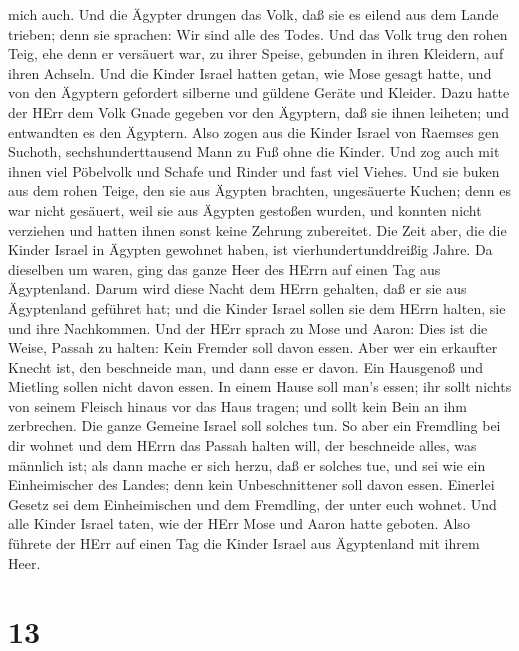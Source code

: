mich auch.  Und die Ägypter drungen das Volk, daß sie es
eilend aus dem Lande trieben; denn sie sprachen: Wir sind alle des
Todes.  Und das Volk trug den rohen Teig, ehe denn er
versäuert war, zu ihrer Speise, gebunden in ihren Kleidern, auf ihren
Achseln.  Und die Kinder Israel hatten getan, wie Mose
gesagt hatte, und von den Ägyptern gefordert silberne und güldene Geräte
und Kleider.  Dazu hatte der HErr dem Volk Gnade gegeben
vor den Ägyptern, daß sie ihnen leiheten; und entwandten es den
Ägyptern.  Also zogen aus die Kinder Israel von Raemses gen
Suchoth, sechshunderttausend Mann zu Fuß ohne die Kinder. 
Und zog auch mit ihnen viel Pöbelvolk und Schafe und Rinder und fast
viel Viehes.  Und sie buken aus dem rohen Teige, den sie
aus Ägypten brachten, ungesäuerte Kuchen; denn es war nicht gesäuert,
weil sie aus Ägypten gestoßen wurden, und konnten nicht verziehen und
hatten ihnen sonst keine Zehrung zubereitet.  Die Zeit
aber, die die Kinder Israel in Ägypten gewohnet haben, ist
vierhundertunddreißig Jahre.  Da dieselben um waren, ging
das ganze Heer des HErrn auf einen Tag aus Ägyptenland. 
Darum wird diese Nacht dem HErrn gehalten, daß er sie aus Ägyptenland
geführet hat; und die Kinder Israel sollen sie dem HErrn halten, sie und
ihre Nachkommen.  Und der HErr sprach zu Mose und Aaron:
Dies ist die Weise, Passah zu halten: Kein Fremder soll davon essen.
 Aber wer ein erkaufter Knecht ist, den beschneide man, und
dann esse er davon.  Ein Hausgenoß und Mietling sollen
nicht davon essen.  In einem Hause soll man's essen; ihr
sollt nichts von seinem Fleisch hinaus vor das Haus tragen; und sollt
kein Bein an ihm zerbrechen.  Die ganze Gemeine Israel soll
solches tun.  So aber ein Fremdling bei dir wohnet und dem
HErrn das Passah halten will, der beschneide alles, was männlich ist;
als dann mache er sich herzu, daß er solches tue, und sei wie ein
Einheimischer des Landes; denn kein Unbeschnittener soll davon essen.
 Einerlei Gesetz sei dem Einheimischen und dem Fremdling,
der unter euch wohnet.  Und alle Kinder Israel taten, wie
der HErr Mose und Aaron hatte geboten.  Also führete der
HErr auf einen Tag die Kinder Israel aus Ägyptenland mit ihrem Heer.

\hypertarget{section-12}{%
\section{13}\label{section-12}}

